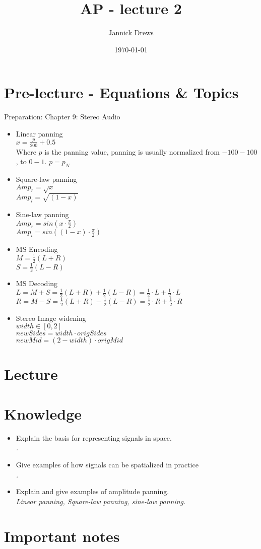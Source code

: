 \documentclass{article}
\title{AP - lecture 2}
\author{Jannick Drews}
\date{\today}
\begin{document}
\maketitle
\newpage

\section{Pre-lecture - Equations \& Topics}
Preparation: Chapter 9: Stereo Audio\\
\begin{itemize}
  \item Linear panning\\
      $ x =  \frac{p}{200} + 0.5$\\
        Where $p$ is the panning value, panning is usually normalized from $-100 - 100$, to $0 - 1$. $ p = p_N$
  \item Square-law panning\\
      $ Amp_r = \sqrt{x} $\\
      $ Amp_l = \sqrt{(1-x)} $
  \item Sine-law panning\\
      $ Amp_r = sin(x \cdot \frac{\pi}{2}) $\\
      $ Amp_l = sin((1-x) \cdot \frac{\pi}{2}) $
  \item MS Encoding\\
      $ M = \frac{1}{2}(L + R) $\\
      $ S = \frac{1}{2}(L - R) $
  \item MS Decoding\\
      $ L = M + S = \frac{1}{2}(L + R) + \frac{1}{2}(L - R) = \frac{1}{2} \cdot L + \frac{1}{2} \cdot L $\\
        $ R = M - S =\frac{1}{2}(L + R)  - \frac{1}{2}(L - R) = \frac{1}{2} \cdot R + \frac{1}{2} \cdot R  $
    \item Stereo Image widening\\
        $ width \in [0 , 2] $\\
        $newSides = width \cdot origSides$\\
        $newMid = (2 - width) \cdot origMid $
\end{itemize}

\section{Lecture}

\section{Knowledge}
\begin{itemize}
    \item Explain the basis for representing signals in space.\\
        \textit{.}
    \item Give examples of how signals can be spatialized in practice\\
        \textit{.}
    \item Explain and give examples of amplitude panning.\\
        \textit{Linear panning, Square-law panning, sine-law panning.}
\end{itemize}

\section{Important notes}
\end{document}
